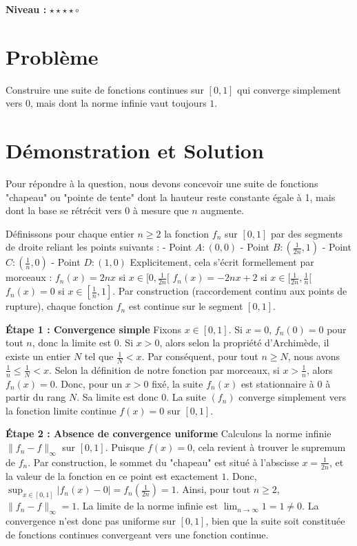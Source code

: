 \documentclass{report}
\begin{document}
\textbf{Niveau :} $\star \star \star \star \circ $

\section*{Problème}

Construire une suite de fonctions continues sur $[0,1]$ qui converge simplement vers $0$, mais dont la norme infinie vaut toujours $1$.

\section*{Démonstration et Solution}

Pour répondre à la question, nous devons concevoir une suite de fonctions "chapeau" ou "pointe de tente" dont la hauteur reste constante égale à 1, mais dont la base se rétrécit vers 0 à mesure que $n$ augmente.

Définissons pour chaque entier $n \geq 2$ la fonction $f_n$ sur $[0,1]$ par des segments de droite reliant les points suivants :
- Point $A : (0, 0)$
- Point $B : (\frac{1}{2n}, 1)$
- Point $C : (\frac{1}{n}, 0)$
- Point $D : (1, 0)$
Explicitement, cela s'écrit formellement par morceaux :
$f_n(x) = 2nx$ si $x \in [0, \frac{1}{2n}[$
$f_n(x) = -2nx + 2$ si $x \in [\frac{1}{2n}, \frac{1}{n}[$
$f_n(x) = 0$ si $x \in [\frac{1}{n}, 1]$.
Par construction (raccordement continu aux points de rupture), chaque fonction $f_n$ est continue sur le segment $[0,1]$.

\textbf{Étape 1 : Convergence simple}
Fixons $x \in [0,1]$.
Si $x = 0$, $f_n(0) = 0$ pour tout $n$, donc la limite est 0.
Si $x > 0$, alors selon la propriété d'Archimède, il existe un entier $N$ tel que $\frac{1}{N} < x$.
Par conséquent, pour tout $n \geq N$, nous avons $\frac{1}{n} \leq \frac{1}{N} < x$.
Selon la définition de notre fonction par morceaux, si $x > \frac{1}{n}$, alors $f_n(x) = 0$.
Donc, pour un $x > 0$ fixé, la suite $f_n(x)$ est stationnaire à 0 à partir du rang $N$. Sa limite est donc 0.
La suite $(f_n)$ converge simplement vers la fonction limite continue $f(x)=0$ sur $[0,1]$.

\textbf{Étape 2 : Absence de convergence uniforme}
Calculons la norme infinie $\|f_n - f\|_\infty$ sur $[0,1]$.
Puisque $f(x)=0$, cela revient à trouver le supremum de $f_n$.
Par construction, le sommet du "chapeau" est situé à l'abscisse $x = \frac{1}{2n}$, et la valeur de la fonction en ce point est exactement $1$.
Donc, $\sup_{x \in [0,1]} |f_n(x) - 0| = f_n(\frac{1}{2n}) = 1$.
Ainsi, pour tout $n \geq 2$, $\|f_n - f\|_\infty = 1$.
La limite de la norme infinie est $\lim_{n \to \infty} 1 = 1 \neq 0$.
La convergence n'est donc pas uniforme sur $[0,1]$, bien que la suite soit constituée de fonctions continues convergeant vers une fonction continue.
\end{document}
